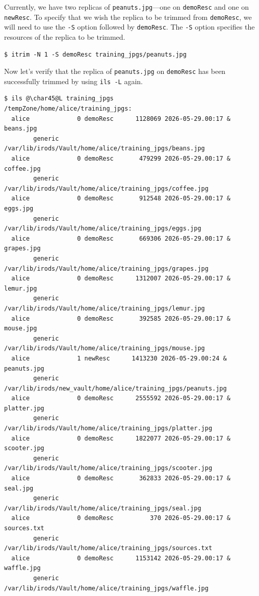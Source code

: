\documentclass[10pt,oneside]{memoir}
\begin{document}
Currently, we have two replicas of \texttt{peanuts.jpg}---one on \texttt{demoResc} and one on \texttt{newResc}. To specify that we wish the replica to be trimmed from \texttt{demoResc}, we will need to use the \texttt{-S} option followed by \texttt{demoResc}. The \texttt{-S} option specifies the resources of the replica to be trimmed.

\begin{lstlisting}
$ itrim -N 1 -S demoResc training_jpgs/peanuts.jpg
\end{lstlisting}

Now let's verify that the replica of \texttt{peanuts.jpg} on \texttt{demoResc} has been successfully trimmed by using \texttt{ils -L} again.

\begin{lstlisting}[basicstyle=\tiny\ttfamily]
$ ils @\char45@L training_jpgs
/tempZone/home/alice/training_jpgs:
  alice             0 demoResc      1128069 2026-05-29.00:17 & beans.jpg
        generic    /var/lib/irods/Vault/home/alice/training_jpgs/beans.jpg
  alice             0 demoResc       479299 2026-05-29.00:17 & coffee.jpg
        generic    /var/lib/irods/Vault/home/alice/training_jpgs/coffee.jpg
  alice             0 demoResc       912548 2026-05-29.00:17 & eggs.jpg
        generic    /var/lib/irods/Vault/home/alice/training_jpgs/eggs.jpg
  alice             0 demoResc       669306 2026-05-29.00:17 & grapes.jpg
        generic    /var/lib/irods/Vault/home/alice/training_jpgs/grapes.jpg
  alice             0 demoResc      1312007 2026-05-29.00:17 & lemur.jpg
        generic    /var/lib/irods/Vault/home/alice/training_jpgs/lemur.jpg
  alice             0 demoResc       392585 2026-05-29.00:17 & mouse.jpg
        generic    /var/lib/irods/Vault/home/alice/training_jpgs/mouse.jpg
  alice             1 newResc      1413230 2026-05-29.00:24 & peanuts.jpg
        generic    /var/lib/irods/new_vault/home/alice/training_jpgs/peanuts.jpg
  alice             0 demoResc      2555592 2026-05-29.00:17 & platter.jpg
        generic    /var/lib/irods/Vault/home/alice/training_jpgs/platter.jpg
  alice             0 demoResc      1822077 2026-05-29.00:17 & scooter.jpg
        generic    /var/lib/irods/Vault/home/alice/training_jpgs/scooter.jpg
  alice             0 demoResc       362833 2026-05-29.00:17 & seal.jpg
        generic    /var/lib/irods/Vault/home/alice/training_jpgs/seal.jpg
  alice             0 demoResc          370 2026-05-29.00:17 & sources.txt
        generic    /var/lib/irods/Vault/home/alice/training_jpgs/sources.txt
  alice             0 demoResc      1153142 2026-05-29.00:17 & waffle.jpg
        generic    /var/lib/irods/Vault/home/alice/training_jpgs/waffle.jpg
\end{lstlisting}
\end{document}
